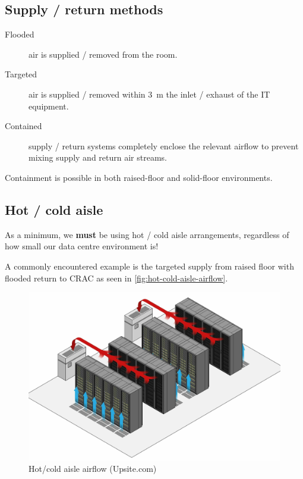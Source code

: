\documentclass{pgnotes}
\begin{document}
\subsection{Supply / return methods}

\begin{description}
\item[Flooded] air is supplied / removed from the room. 
\item[Targeted] air is supplied / removed within \SI{3}{\metre} the inlet / exhaust of the IT equipment. 
\item[Contained] supply / return systems completely enclose the relevant airflow to prevent mixing supply and return air streams. 
\end{description}

Containment is possible in both raised-floor and solid-floor environments.

\subsection{Hot / cold aisle}

As a minimum, we \textbf{must} be using hot / cold aisle arrangements, regardless of how small our data centre environment is!

A commonly encountered example is the targeted supply from raised floor with flooded return to CRAC as seen in \autoref{fig:hot-cold-aisle-airflow}. 

\begin{figure}[htbp]
  \centering
  \includegraphics[width=0.75\linewidth]{dc_airflow}
  \caption{Hot/cold aisle airflow (Upsite.com)}
  \label{fig:hot-cold-aisle-airflow}
\end{figure}

\end{document}
